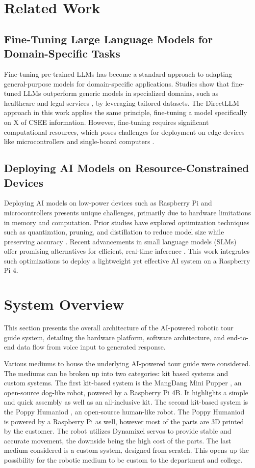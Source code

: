 \documentclass[conference]{IEEEtran}
\begin{document}
\section{Related Work}
\subsection{Fine-Tuning Large Language Models for Domain-Specific Tasks}
Fine-tuning pre-trained LLMs has become a standard approach to adapting general-purpose models for domain-specific applications. 
Studies show that fine-tuned LLMs outperform generic models in specialized domains, such as healthcare and legal services \cite{b2}, by leveraging tailored datasets. 
The DirectLLM approach in this work applies the same principle, fine-tuning a model specifically on X of CSEE information. 
However, fine-tuning requires significant computational resources, which poses challenges for deployment on edge devices like microcontrollers and single-board computers \cite{b3}.

\subsection{Deploying AI Models on Resource-Constrained Devices}
Deploying AI models on low-power devices such as Raspberry Pi and microcontrollers presents unique challenges, primarily due to hardware limitations in memory and computation. 
Prior studies have explored optimization techniques such as quantization, pruning, and distillation to reduce model size while preserving accuracy \cite{b4}. 
Recent advancements in small language models (SLMs) offer promising alternatives for efficient, real-time inference \cite{b5}. 
This work integrates such optimizations to deploy a lightweight yet effective AI system on a Raspberry Pi 4.

\section{System Overview}
This section presents the overall architecture of the AI-powered robotic tour guide system, detailing the hardware platform,
software architecture, and end-to-end data flow from voice input to generated response.

Various mediums to house the underlying AI-powered tour guide were considered. The mediums can be broken up into two categories: kit based systems and custom systems.
The first kit-based system is the MangDang Mini Pupper \cite{b1}, an open-source dog-like robot, powered by a Raspberry Pi 4B. It highlights a simple and quick assembly as well as an all-inclusive kit. 
The second kit-based system is the Poppy Humaniod \cite{b6}, an open-source human-like robot. The Poppy Humaniod is powered by a Raspberry Pi as well, however most of the parts are 3D printed by the customer. The robot utilizes Dynamixel servos to provide stable and accurate movement, the downside being the high cost of the parts.
The last medium considered is a custom system, designed from scratch. This opens up the possibility for the robotic medium to be custom to the department and college. 
\end{document}
